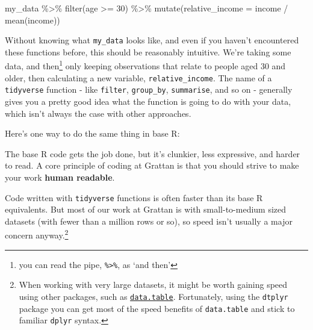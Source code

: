 \documentclass[
]{book}
\newenvironment{Shaded}{\begin{snugshade}}{\end{snugshade}}
\newcommand{\AttributeTok}[1]{\textcolor[rgb]{0.77,0.63,0.00}{#1}}
\newcommand{\DecValTok}[1]{\textcolor[rgb]{0.00,0.00,0.81}{#1}}
\newcommand{\FunctionTok}[1]{\textcolor[rgb]{0.00,0.00,0.00}{#1}}
\newcommand{\NormalTok}[1]{#1}
\newcommand{\SpecialCharTok}[1]{\textcolor[rgb]{0.00,0.00,0.00}{#1}}
\begin{document}
\begin{Shaded}
\begin{Highlighting}[]
\NormalTok{my\_data }\SpecialCharTok{\%\textgreater{}\%}
  \FunctionTok{filter}\NormalTok{(age }\SpecialCharTok{\textgreater{}=} \DecValTok{30}\NormalTok{) }\SpecialCharTok{\%\textgreater{}\%}
  \FunctionTok{mutate}\NormalTok{(}\AttributeTok{relative\_income =}\NormalTok{ income }\SpecialCharTok{/} \FunctionTok{mean}\NormalTok{(income))}
\end{Highlighting}
\end{Shaded}

Without knowing what \texttt{my\_data} looks like, and even if you haven't encountered these functions before, this should be reasonably intuitive. We're taking some data, and then\footnote{you can read the pipe, \texttt{\%\textgreater{}\%}, as `and then'} only keeping observations that relate to people aged 30 and older, then calculating a new variable, \texttt{relative\_income}. The name of a \texttt{tidyverse} function - like \texttt{filter}, \texttt{group\_by}, \texttt{summarise}, and so on - generally gives you a pretty good idea what the function is going to do with your data, which isn't always the case with other approaches.

Here's one way to do the same thing in base R:

\begin{Shaded}
\end{Shaded}

The base R code gets the job done, but it's clunkier, less expressive, and harder to read. A core principle of coding at Grattan is that you should strive to make your work \textbf{human readable}.

Code written with \texttt{tidyverse} functions is often faster than its base R equivalents. But most of our work at Grattan is with small-to-medium sized datasets (with fewer than a million rows or so), so speed isn't usually a major concern anyway.\footnote{When working with very large datasets, it might be worth gaining speed using other packages, such as \href{https://cran.r-project.org/web/packages/data.table/vignettes/datatable-intro.html}{\texttt{data.table}}. Fortunately, using the \texttt{dtplyr} package you can get most of the speed benefits of \texttt{data.table} and stick to familiar \texttt{dplyr} syntax.}
\end{document}
